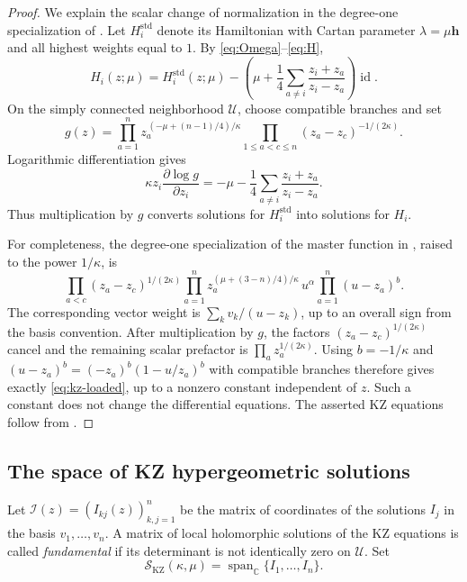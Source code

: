 \documentclass[12pt]{amsart}
\theoremstyle{definition}
\numberwithin{equation}{section}
\theoremstyle{definition}
\let\mc\mathcal
\let\ka\kappa
\let\le\leqslant
\let\on\operatorname
\def\C{{\mathbb C}}
\def\id{\on{id}}
\def\beq{\begin{equation}}
\def\eeq{\end{equation}}
\begin{document}
\begin{proof}
We explain the scalar change of normalization in the degree-one
specialization of \cite[Corollary~4.2]{MaV02}.  Let
$H_i^{\mathrm{std}}$ denote its Hamiltonian with Cartan parameter
$\lambda=\mu\mathbf h$ and all highest weights equal to $1$.
By \eqref{eq:Omega}--\eqref{eq:H},
\[
 H_i(z;\mu)=H_i^{\mathrm{std}}(z;\mu)
 -\left(\mu+\frac14\sum_{a\ne i}
                  \frac{z_i+z_a}{z_i-z_a}\right)\id.
\]
On the simply connected neighborhood $\mc U$, choose compatible
branches and set
\[
 g(z)=\prod_{a=1}^n
 z_a^{\,(-\mu+(n-1)/4)/\ka}
 \prod_{1\le a<c\le n}(z_a-z_c)^{-1/(2\ka)}.
\]
Logarithmic differentiation gives
\[
 \ka z_i\frac{\partial\log g}{\partial z_i}
 =-\mu-\frac14\sum_{a\ne i}\frac{z_i+z_a}{z_i-z_a}.
\]
Thus multiplication by $g$ converts solutions for
$H_i^{\mathrm{std}}$ into solutions for $H_i$.

For completeness, the degree-one specialization of the master
function in \cite[(16)]{MaV02}, raised to the power $1/\ka$, is
\[
 \prod_{a<c}(z_a-z_c)^{1/(2\ka)}
 \prod_{a=1}^n z_a^{(\mu+(3-n)/4)/\ka}\,
 u^\alpha\prod_{a=1}^n(u-z_a)^b.
\]
The corresponding vector weight is
$\sum_k v_k/(u-z_k)$, up to an overall sign from the basis
convention. After multiplication by $g$, the factors
$(z_a-z_c)^{1/(2\ka)}$ cancel and the remaining scalar
prefactor is $\prod_a z_a^{1/(2\ka)}$.
Using $b=-1/\ka$ and
$(u-z_a)^b=(-z_a)^b(1-u/z_a)^b$ with compatible branches
therefore gives exactly \eqref{eq:kz-loaded}, up to a nonzero
constant independent of $z$. Such a constant does not change
the differential equations.  The asserted KZ equations follow
from \cite[Corollary~4.2]{MaV02}.
\end{proof}


\subsection{The space of KZ hypergeometric solutions}

Let $\mc I(z)=(I_{kj}(z))_{k,j=1}^n$ be the matrix of coordinates
of the solutions $I_j$ in the basis $v_1,\ldots,v_n$.
A matrix of local holomorphic solutions of the KZ equations is
called \emph{fundamental} if its determinant is not identically
zero on $\mc U$.
Set
\beq\label{eq:kz-solution-space}
 \mc S_{\mathrm{KZ}}(\ka,\mu)
 =\operatorname{span}_{\C}\{I_1,\ldots,I_n\}.
\eeq
\end{document}
